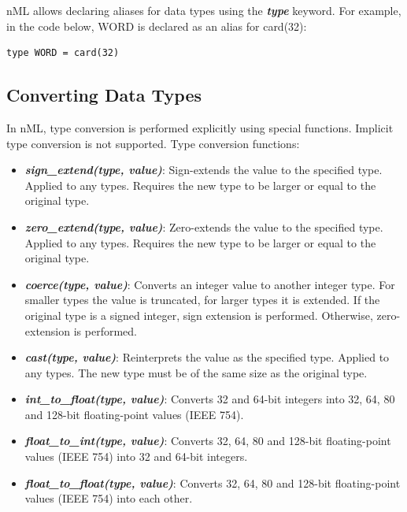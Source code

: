\documentclass[oneside,final,14pt]{extreport}
\begin{document}
nML allows declaring aliases for data types using the \textbf{\textit{type}} keyword.
For example, in the code below, WORD is declared as an alias for card(32):

\begin{lstlisting}
type WORD = card(32)
\end{lstlisting}

\subsection{Converting Data Types}

In nML, type conversion is performed explicitly using special functions.
Implicit type conversion is not supported. Type conversion functions:

\begin{itemize}
\item \textbf{\textit{sign{\_}extend(type, value)}}:
Sign-extends the value to the specified type. Applied to any types. Requires
the new type to be larger or equal to the original type.

\item \textbf{\textit{zero{\_}extend(type, value)}}:
Zero-extends the value to the specified type. Applied to any types. Requires
the new type to be larger or equal to the original type.

\item \textbf{\textit{coerce(type, value)}}:
Converts an integer value to another integer type. For smaller types the value
is truncated, for larger types it is extended. If the original type is a signed
integer, sign extension is performed. Otherwise, zero-extension is performed.

\item \textbf{\textit{cast(type, value)}}:
Reinterprets the value as the specified type. Applied to any types. The new type
must be of the same size as the original type.

\item \textbf{\textit{int{\_}to{\_}float(type, value)}}:
Converts 32 and 64-bit integers into 32, 64, 80 and 128-bit floating-point
values (IEEE 754).

\item \textbf{\textit{float{\_}to{\_}int(type, value)}}:
Converts 32, 64, 80 and 128-bit floating-point values (IEEE 754) into 32 and
64-bit integers.

\item \textbf{\textit{float{\_}to{\_}float(type, value)}}:
Converts 32, 64, 80 and 128-bit floating-point values (IEEE 754) into each
other.

\end{itemize}
\end{document}
